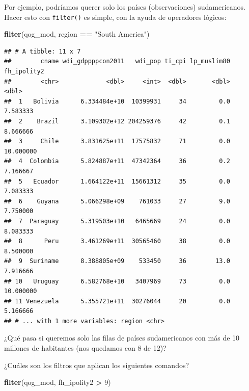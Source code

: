 \documentclass[]{book}
\newenvironment{Shaded}{\begin{snugshade}}{\end{snugshade}}
\newcommand{\KeywordTok}[1]{\textcolor[rgb]{0.13,0.29,0.53}{\textbf{#1}}}
\newcommand{\DecValTok}[1]{\textcolor[rgb]{0.00,0.00,0.81}{#1}}
\newcommand{\StringTok}[1]{\textcolor[rgb]{0.31,0.60,0.02}{#1}}
\newcommand{\OperatorTok}[1]{\textcolor[rgb]{0.81,0.36,0.00}{\textbf{#1}}}
\newcommand{\NormalTok}[1]{#1}
\begin{document}
Por ejemplo, podríamos querer solo los países (observaciones)
sudamericanos. Hacer esto con \texttt{filter()} es simple, con la ayuda
de operadores lógicos:

\begin{Shaded}
\begin{Highlighting}[]
\KeywordTok{filter}\NormalTok{(qog_mod, region }\OperatorTok{==}\StringTok{ "South America"}\NormalTok{)}
\end{Highlighting}
\end{Shaded}

\begin{verbatim}
## # A tibble: 11 x 7
##        cname wdi_gdppppcon2011   wdi_pop ti_cpi lp_muslim80 fh_ipolity2
##        <chr>             <dbl>     <int>  <dbl>       <dbl>       <dbl>
##  1   Bolivia      6.334484e+10  10399931     34         0.0    7.583333
##  2    Brazil      3.109302e+12 204259376     42         0.1    8.666666
##  3     Chile      3.831625e+11  17575832     71         0.0   10.000000
##  4  Colombia      5.824887e+11  47342364     36         0.2    7.166667
##  5   Ecuador      1.664122e+11  15661312     35         0.0    7.083333
##  6    Guyana      5.066298e+09    761033     27         9.0    7.750000
##  7  Paraguay      5.319503e+10   6465669     24         0.0    8.083333
##  8      Peru      3.461269e+11  30565460     38         0.0    8.500000
##  9  Suriname      8.388805e+09    533450     36        13.0    7.916666
## 10   Uruguay      6.582768e+10   3407969     73         0.0   10.000000
## 11 Venezuela      5.355721e+11  30276044     20         0.0    5.166666
## # ... with 1 more variables: region <chr>
\end{verbatim}

¿Qué pasa si queremos solo las filas de países sudamericanos con más de
10 millones de habitantes (nos quedamos con 8 de 12)?

¿Cuáles son los filtros que aplican los siguientes comandos?

\begin{Shaded}
\begin{Highlighting}[]
\KeywordTok{filter}\NormalTok{(qog_mod, fh_ipolity2 }\OperatorTok{>}\StringTok{ }\DecValTok{9}\NormalTok{)}
\end{Highlighting}
\end{Shaded}
\end{document}
